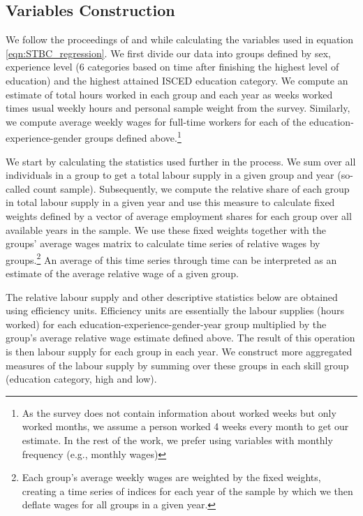 \documentclass[11pt]{article}
\begin{document}
\subsection{Variables Construction} \label{KM_vars}
We follow the proceedings of \citet{katz1992changes} and \citet{glitz2021skill} while calculating the variables used in equation \ref{eqn:STBC_regression}. We first divide our data into groups defined by sex, experience level (6 categories based on time after finishing the highest level of education) and the highest attained ISCED education category.
We compute an estimate of total hours worked in each group and each year as weeks worked times usual weekly hours and personal sample weight from the survey. Similarly, we compute average weekly wages for full-time workers for each of the education-experience-gender groups defined above.\footnote{As the survey does not contain information about worked weeks but only worked months, we assume a person worked 4 weeks every month to get our estimate. In the rest of the work, we prefer using variables with monthly frequency (e.g., monthly wages)}

We start by calculating the statistics used further in the process. We sum over all individuals in a group to get a total labour supply in a given group and year (so-called count sample). Subsequently, we compute the relative share of each group in total labour supply in a given year and use this measure to calculate fixed weights defined by a vector of average employment shares for each group over all available years in the sample. We use these fixed weights together with the groups' average wages matrix to calculate time series of relative wages by groups.\footnote{Each group's average weekly wages are weighted by the fixed weights, creating a time series of indices for each year of the sample by which we then deflate wages for all groups in a given year.} An average of this time series through time can be interpreted as an estimate of the average relative wage of a given group.%

The relative labour supply and other descriptive statistics below are obtained using efficiency units. Efficiency units are essentially the labour supplies (hours worked) for each education-experience-gender-year group multiplied by the group's average relative wage estimate defined above. The result of this operation is then labour supply for each group in each year. We construct more aggregated measures of the labour supply by summing over these groups in each skill group (education category, high and low).
\end{document}
